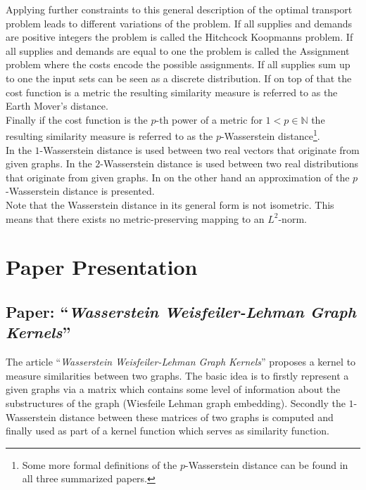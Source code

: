 \documentclass[twoside]{scrartcl}
\begin{document}
Applying further constraints to this general description of the optimal transport problem leads to different variations of the problem. If all supplies and demands are positive integers the problem is called the Hitchcock Koopmanns problem. If all supplies and demands are equal to one the problem is called the Assignment problem where the costs encode the possible assignments.  If all supplies sum up to one the input sets can be seen as a discrete distribution. If on top of that the cost function is a metric the resulting similarity measure is referred to as the Earth Mover's distance.\\
Finally if the cost function is the $p$-th power of a metric for $1<p\in\mathbb{N}$ the resulting similarity measure is referred to as the $p$-Wasserstein distance\footnote{Some more formal definitions of the $p$-Wasserstein distance can be found in all three summarized papers.}.\\
In \cite{A} the $1$-Wasserstein distance is used between two real vectors that originate from given graphs. In \cite{B} the $2$-Wasserstein distance is used between two real distributions that originate from given graphs. In \cite{C} on the other hand an approximation of the $p$-Wasserstein distance is presented.\\ %

Note that the Wasserstein distance in its general form is not isometric. This means that there exists no metric-preserving mapping to an $L^2$-norm.%

\section{Paper Presentation}

\subsection{Paper: \enquote{\textit{Wasserstein Weisfeiler-Lehman Graph Kernels}}} %
The article \enquote{\textit{Wasserstein Weisfeiler-Lehman Graph Kernels}} proposes a kernel to measure similarities between two graphs. The basic idea is to firstly represent a given graphs via a matrix which contains some level of information about the substructures of the graph (Wiesfeile Lehman graph embedding). Secondly the $1$-Wasserstein distance between these matrices of two graphs is computed and finally used as part of a kernel function which serves as similarity function.
\end{document}
